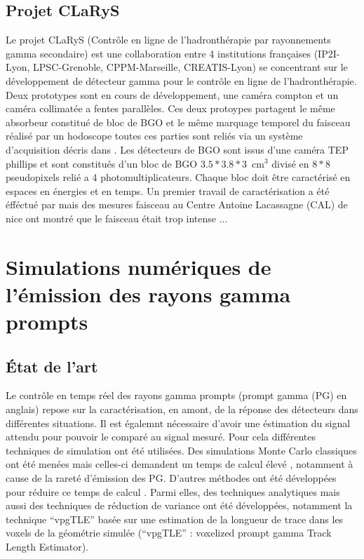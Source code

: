 \documentclass[11pt,a4paper,oldfontcommands]{memoir}
\begin{document}
\subsection{Projet CLaRyS}

Le projet CLaRyS (Contrôle en ligne de l’hadronthérapie par rayonnements gamma secondaire) est une collaboration entre 4 institutions françaises (IP2I-Lyon, LPSC-Grenoble, CPPM-Marseille, CREATIS-Lyon) se concentrant sur le développement de détecteur gamma pour le contrôle en ligne de l'hadronthérapie. Deux prototypes sont en cours de développement, une caméra compton et un caméra collimatée a fentes parallèles. Ces deux protoypes partagent le même absorbeur constitué de bloc de BGO et le même marquage temporel du faisceau réalisé par un hodoscope toutes ces parties sont reliés via un système d'acquisition décris dans \cite{Caplan_2019}. Les détecteurs de BGO sont issus d'une caméra TEP phillips et sont constitués d'un bloc de BGO $3.5 * 3.8 * 3$~cm$^3$ divisé en $8*8$ pseudopixels relié a 4 photomultiplicateurs. Chaque bloc doit être caractérisé en espaces en énergies et en temps. Un premier travail de caractérisation a été éfféctué par \cite{Fontana_2018} mais des mesures faisceau au Centre Antoine Lacassagne (CAL) de nice ont montré que le faisceau était trop intense ...


\section{Simulations numériques de l'émission des rayons gamma prompts}

\subsection{\'Etat de l'art}

Le contrôle en temps réel des rayons gamma prompts (prompt gamma (PG) en anglais) repose sur la caractérisation, en amont, de la réponse des détecteurs dans différentes situations. Il est égalemnt nécessaire d'avoir une éstimation du signal attendu pour pouvoir le comparé au signal mesuré.  Pour cela différentes techniques de simulation ont été utilisées. Des simulations Monte Carlo classiques ont été menées mais celles-ci demandent un temps de calcul élevé \cite{KRIMMER201858}, notamment à cause de la rareté d'émission des PG. D'autres méthodes ont été développées pour réduire ce temps de calcul \cite{Qin_2017}. Parmi elles, des techniques analytiques \cite{Sterpin_2015} mais aussi des techniques de réduction de variance ont été développées, notamment la technique \enquote{vpgTLE} basée sur une estimation de la longueur de trace dans les voxels de la géométrie simulée (\enquote{vpgTLE} : voxelized prompt gamma Track Length Estimator).
\end{document}
